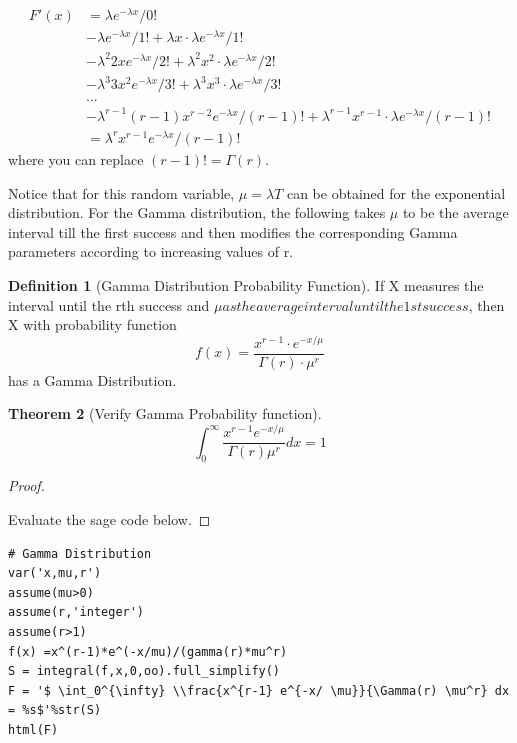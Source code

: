 \documentclass[10pt,]{book}
\theoremstyle{plain}
\newtheorem{theorem}{Theorem}[section]
\theoremstyle{definition}
\newtheorem{definition}[theorem]{Definition}
\theoremstyle{definition}
\theoremstyle{definition}
\numberwithin{equation}{section}
\begin{document}
\begin{align*}
F'(x) & = \lambda e^{-\lambda x}/0!\\
 & - \lambda e^{-\lambda x}/1! + \lambda x \cdot \lambda e^{-\lambda x}/1!\\
 & - \lambda^2 2x e^{-\lambda x}/2! + \lambda^2 x^2 \cdot \lambda e^{-\lambda x}/2!\\
 & - \lambda^3 3x^2 e^{-\lambda x}/3! + \lambda^3 x^3 \cdot \lambda e^{-\lambda x}/3!\\
 & . . .\\
 & - \lambda^{r-1} (r-1)x^{r-2} e^{-\lambda x}/(r-1)! + \lambda^{r-1} x^{r-1} \cdot \lambda e^{-\lambda x}/(r-1)!\\
 & = \lambda^r x^{r-1} e^{-\lambda x}/(r-1)!
\end{align*}
where you can replace \((r-1)! = \Gamma(r)\).
%
\par

Notice that for this random variable, \(\mu = \lambda T\) can be obtained for the exponential distribution. For the Gamma distribution, the following takes \(\mu\) to be the average interval till the first success and then modifies the corresponding Gamma parameters according to increasing values of r.
%
\par

\begin{definition}[{Gamma Distribution Probability Function}]\label{definition-34}
If X measures the interval until the rth success and \(\mu as the average interval until the 1st success\), then X with probability function
\begin{equation*}f(x) =  \frac{x^{r-1} \cdot e^{-x / \mu}}{\Gamma(r) \cdot \mu^r}\end{equation*}
has a Gamma Distribution.
\end{definition}


\begin{theorem}[{Verify Gamma Probability function}]\label{theorem-54}
\begin{equation*}\int_0^{\infty} \frac{x^{r-1} e^{-x/ \mu}}{\Gamma(r) \mu^r} dx = 1\end{equation*}\end{theorem}
\begin{proof}\hypertarget{proof-53}{}

Evaluate the sage code below.
%
\end{proof}


\begin{lstlisting}[style=sageinput]
# Gamma Distribution
var('x,mu,r')
assume(mu>0)
assume(r,'integer')
assume(r>1)
f(x) =x^(r-1)*e^(-x/mu)/(gamma(r)*mu^r)
S = integral(f,x,0,oo).full_simplify()
F = '$ \int_0^{\infty} \\frac{x^{r-1} e^{-x/ \mu}}{\Gamma(r) \mu^r} dx = %s$'%str(S)
html(F)
\end{lstlisting}
\end{document}
